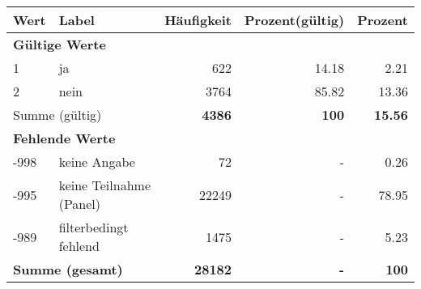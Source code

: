      \begin{longtable}{lXrrr}
     \toprule
     \textbf{Wert} & \textbf{Label} & \textbf{Häufigkeit} & \textbf{Prozent(gültig)} & \textbf{Prozent} \\
     \endhead
     \midrule
     \multicolumn{5}{l}{\textbf{Gültige Werte}}\\

     1 &
     \multicolumn{1}{X}{ ja   } &


       \num{622} &
       \num[round-mode=places,round-precision=2]{14,18} &
         \num[round-mode=places,round-precision=2]{2,21} \\

     2 &
     \multicolumn{1}{X}{ nein   } &


       \num{3764} &
       \num[round-mode=places,round-precision=2]{85,82} &
         \num[round-mode=places,round-precision=2]{13,36} \\
     \midrule
     \multicolumn{2}{l}{Summe (gültig)} &
       \textbf{\num{4386}} &
     \textbf{100} &
       \textbf{\num[round-mode=places,round-precision=2]{15,56}} \\
     \multicolumn{5}{l}{\textbf{Fehlende Werte}}\\
       -998 &
       keine Angabe &
         \num{72} &
        - &
         \num[round-mode=places,round-precision=2]{0,26} \\
       -995 &
       keine Teilnahme (Panel) &
         \num{22249} &
        - &
         \num[round-mode=places,round-precision=2]{78,95} \\
       -989 &
       filterbedingt fehlend &
         \num{1475} &
        - &
         \num[round-mode=places,round-precision=2]{5,23} \\
     \midrule
     \multicolumn{2}{l}{\textbf{Summe (gesamt)}} &
          \textbf{\num{28182}} &
        \textbf{-} &
        \textbf{100} \\
     \bottomrule
     \end{longtable}
     
